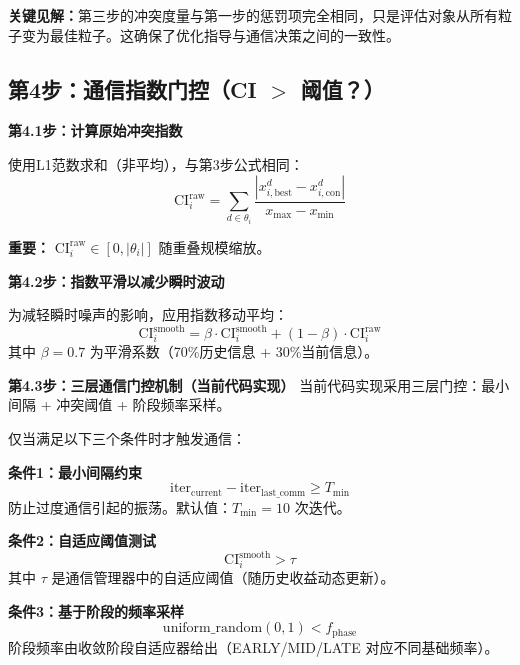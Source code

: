 \documentclass[11pt,a3paper]{ctexart}
\begin{document}
\textbf{关键见解：}第三步的冲突度量与第一步的惩罚项完全相同，只是评估对象从所有粒子变为最佳粒子。这确保了优化指导与通信决策之间的一致性。
\subsection{第4步：通信指数门控（CI $>$ 阈值？）}

\textbf{第4.1步：计算原始冲突指数}

使用L1范数求和（非平均），与第3步公式相同：
\begin{equation}
\text{CI}_i^{\text{raw}} = \sum_{d \in \theta_i} \frac{|x_{i,\text{best}}^d - x_{i,\text{con}}^d|}{x_{\max} - x_{\min}}
\end{equation}

\textbf{重要：} $\text{CI}_i^{\text{raw}} \in [0, |\theta_i|]$ 随重叠规模缩放。

\textbf{第4.2步：指数平滑以减少瞬时波动}

为减轻瞬时噪声的影响，应用指数移动平均：
\begin{equation}
\text{CI}_i^{\text{smooth}} = \beta \cdot \text{CI}_i^{\text{smooth}} + (1 - \beta) \cdot \text{CI}_i^{\text{raw}}
\end{equation}
其中 $\beta = 0.7$ 为平滑系数（70\%历史信息 + 30\%当前信息）。

\textbf{第4.3步：三层通信门控机制（当前代码实现）}
当前代码实现采用三层门控：最小间隔 + 冲突阈值 + 阶段频率采样。

仅当满足以下三个条件时才触发通信：

\textbf{条件1：最小间隔约束}
\begin{equation}
\text{iter}_{\text{current}} - \text{iter}_{\text{last\_comm}} \geq T_{\min}
\end{equation}
防止过度通信引起的振荡。默认值：$T_{\min} = 10$ 次迭代。

\textbf{条件2：自适应阈值测试}
\begin{equation}
\text{CI}_i^{\text{smooth}} > \tau
\end{equation}
其中 $\tau$ 是通信管理器中的自适应阈值（随历史收益动态更新）。

\textbf{条件3：基于阶段的频率采样}
\begin{equation}
\text{uniform\_random}(0,1) < f_{\text{phase}}
\end{equation}
阶段频率由收敛阶段自适应器给出（EARLY/MID/LATE 对应不同基础频率）。
\end{document}
